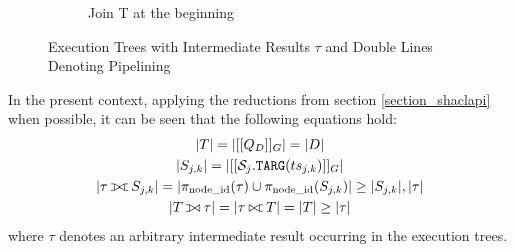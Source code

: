 \begin{figure*}
\begin{subfigure}[b]{0.4\textwidth}
            \caption{Join T at the beginning}
            \label{fig:join_strategies_left_deep2}
    \end{subfigure}
    \caption{Execution Trees with Intermediate Results $\tau$ and Double Lines Denoting Pipelining}
    \label{fig:join_strategies_left_deep}
\end{figure*}

In the present context, applying the reductions from section \ref{section_shaclapi} when possible, it can be seen that the following equations hold:
\begin{gather}
    |T| = |[[Q_D]]_G| = |D| \label{eq:size_t}\\
    |S_{j,k}| = |[[\mathcal{S}_j.\uri{TARG}(ts_{j,k})]]_G| \label{eq:size_s}\\
    |\tau \fullouterjoin S_{j,k}| = |\pi_{\textrm{node\_id}}(\tau) \cup \pi_{\textrm{node\_id}}(S_{j,k})| \geq |S_{j,k}|, |\tau| \label{eq:join_s}\\
    |T \leftouterjoin \tau| = |\tau \rightouterjoin T| = |T| \geq |\tau| \label{eq:join_t}
\end{gather}
where $\tau$ denotes an arbitrary intermediate result occurring in the execution trees. 

